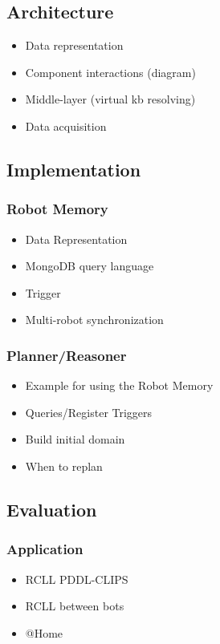 \documentclass[a4paper,11pt]{article}
\begin{document}
\subsection{Architecture}
\label{sec:arch}
\begin{itemize}
\item Data representation
\item Component interactions (diagram)
\item Middle-layer (virtual kb resolving)
\item Data acquisition
\end{itemize}


\subsection{Implementation}
\label{sec:impl}
\subsubsection{Robot Memory}
\label{sec:impl-memory}
\begin{itemize}
\item Data Representation
\item MongoDB query language
\item Trigger
\item Multi-robot synchronization
\end{itemize}
\subsubsection{Planner/Reasoner}
\label{sec:impl-planner}
\begin{itemize}
\item Example for using the Robot Memory
\item Queries/Register Triggers
\item Build initial domain
\item When to replan
\end{itemize}

\subsection{Evaluation}
\label{sec:eval}
\subsubsection{Application}
\label{sec:eval-apl}
\begin{itemize}
\item RCLL PDDL-CLIPS
\item RCLL between bots
\item @Home
\end{itemize}
\end{document}
